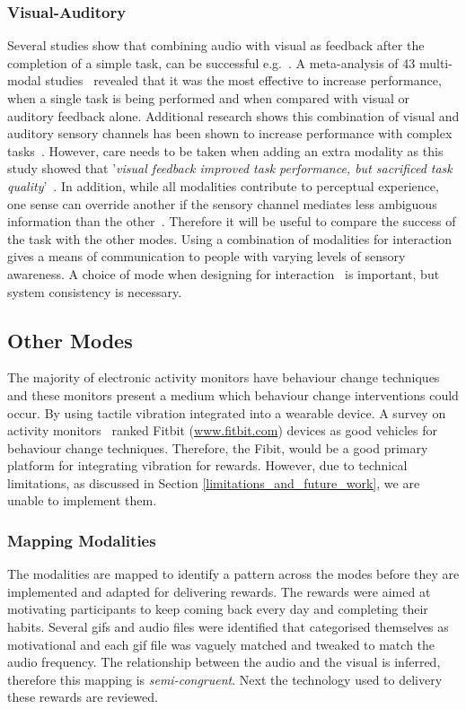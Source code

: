 \subsubsection{Visual-Auditory}
Several studies show that combining audio with visual as feedback after the completion of a simple task, can be successful e.g.~\cite{benefits_of_audio_visual_1, benefits_of_audio_visual_2}. A meta-analysis of 43 multi-modal studies~\cite{comparing_modalities_effects_of_visual_auditory} revealed that it was the most effective to increase performance, when a single task is being performed and when compared with visual or auditory feedback alone. Additional research shows this combination of visual and auditory sensory channels has been shown to increase performance with complex tasks~\cite{chi_oussama_tap_the_shapetones}. However, care needs to be taken when adding an extra modality as this study showed that '\textit{visual feedback improved task performance, but sacrificed task quality}'~\cite{comparing_modalities_effects_of_visual_auditory}. In addition, while all modalities contribute to perceptual experience, one sense can override another if the sensory channel mediates less ambiguous information than the other~\cite{one_mode_override_another}. Therefore it will be useful to compare the success of the task with the other modes. Using a combination of modalities for interaction gives a means of communication to people with varying levels of sensory awareness. A choice of mode when designing for interaction~\cite{article_user_centred_multimodal_reminders} is important, but system consistency is necessary.


\subsection*{Other Modes}
The majority of electronic activity monitors have behaviour change techniques and these monitors present a medium which behaviour change interventions could occur. By using tactile vibration integrated into a wearable device. A survey on activity monitors~\cite{article_wearable_good} ranked Fitbit (\url{www.fitbit.com}) devices as good vehicles for behaviour change techniques. Therefore, the Fibit, would be a good primary platform for integrating vibration for rewards. However, due to technical limitations, as discussed in Section \ref{limitations_and_future_work}, we are unable to implement them.


\subsubsection*{Mapping Modalities}
The modalities are mapped to identify a pattern across the modes before they are implemented and adapted for delivering rewards. The rewards were aimed at motivating participants to keep coming back every day and completing their habits. Several gifs and audio files were identified that categorised themselves as motivational and each gif file was vaguely matched and tweaked to match the audio frequency. The relationship between the audio and the visual is inferred, therefore this mapping is \textit{semi-congruent}. Next the technology used to delivery these rewards are reviewed.

